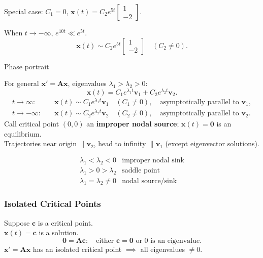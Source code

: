\begin{example}
  Special case: $C_1=0$, $\mathbf{x}(t)=C_2e^{5t}
    \begin{bmatrix}
      1 \\-2
    \end{bmatrix}
  $.

  When $t\to-\infty$, $e^{10t}\ll e^{5t}$.
  \[
    \mathbf{x}(t)\sim C_2e^{5t}
    \begin{bmatrix}
      1 \\-2
    \end{bmatrix}
    \quad(C_2\ne0).
  \]
  \begin{center}
    Phase portrait\\
    
  \end{center}
\end{example}

For general $\mathbf{x}'=\mathbf{A}\mathbf{x}$, eigenvalues $\lambda_1>\lambda_2>0$:
\[
  \mathbf{x}(t)=C_1e^{\lambda_1t}\mathbf{v}_1+C_2e^{\lambda_2t}\mathbf{v}_2.
\]
\begin{align*}
  t\to\infty:  & \quad\mathbf{x}(t)\sim C_1e^{\lambda_1t}\mathbf{v}_1
  \quad(C_1\ne0),\quad\text{asymptotically parallel to }\mathbf{v}_1, \\
  t\to-\infty: & \quad\mathbf{x}(t)\sim C_2e^{\lambda_2t}\mathbf{v}_2
  \quad(C_2\ne0),\quad\text{asymptotically parallel to }\mathbf{v}_2.
\end{align*}
Call critical point $(0,0)$ an \textbf{improper nodal source};
$\mathbf{x}(t)=\mathbf{0}$ is an equilibrium.\\
Trajectories near origin $\parallel\mathbf{v}_2$, head to infinity $\parallel\mathbf{v}_1$
(except eigenvector solutions).
\begin{center}
  
\end{center}
\[
  \begin{array}{c|l}
    \lambda_1<\lambda_2<0   & \text{improper nodal sink} \\
    \lambda_1>0>\lambda_2   & \text{saddle point}        \\
    \lambda_1=\lambda_2\ne0 & \text{nodal source/sink}
  \end{array}
\]

\subsubsection{Isolated Critical Points}
Suppose $\mathbf{c}$ is a critical point.\\
$\mathbf{x}(t)=\mathbf{c}$ is a solution.
\[
  \mathbf{0}=\mathbf{A}\mathbf{c}:\quad
  \text{either }\mathbf{c}=\mathbf{0}\text{ or }0\text{ is an eigenvalue}.
\]
$\mathbf{x}'=\mathbf{A}\mathbf{x}$ has an isolated critical point
$\implies$ all eigenvalues $\ne0$.

